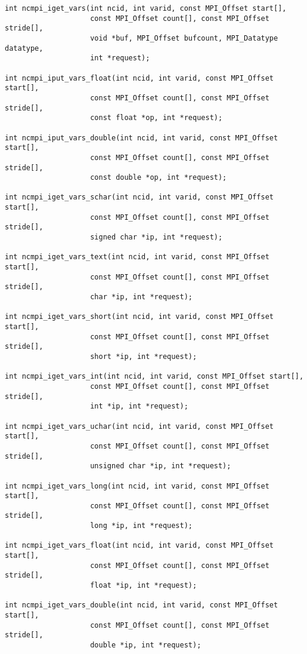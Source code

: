 \begin{verbatim}
int ncmpi_iget_vars(int ncid, int varid, const MPI_Offset start[],
                    const MPI_Offset count[], const MPI_Offset stride[],
                    void *buf, MPI_Offset bufcount, MPI_Datatype datatype,
                    int *request); 

int ncmpi_iput_vars_float(int ncid, int varid, const MPI_Offset start[],
                    const MPI_Offset count[], const MPI_Offset stride[],
                    const float *op, int *request); 

int ncmpi_iput_vars_double(int ncid, int varid, const MPI_Offset start[],
                    const MPI_Offset count[], const MPI_Offset stride[],
                    const double *op, int *request); 

int ncmpi_iget_vars_schar(int ncid, int varid, const MPI_Offset start[],
                    const MPI_Offset count[], const MPI_Offset stride[],
                    signed char *ip, int *request); 

int ncmpi_iget_vars_text(int ncid, int varid, const MPI_Offset start[],
                    const MPI_Offset count[], const MPI_Offset stride[],
                    char *ip, int *request); 

int ncmpi_iget_vars_short(int ncid, int varid, const MPI_Offset start[],
                    const MPI_Offset count[], const MPI_Offset stride[],
                    short *ip, int *request); 

int ncmpi_iget_vars_int(int ncid, int varid, const MPI_Offset start[],
                    const MPI_Offset count[], const MPI_Offset stride[],
                    int *ip, int *request); 

int ncmpi_iget_vars_uchar(int ncid, int varid, const MPI_Offset start[],
                    const MPI_Offset count[], const MPI_Offset stride[],
                    unsigned char *ip, int *request);

int ncmpi_iget_vars_long(int ncid, int varid, const MPI_Offset start[],
                    const MPI_Offset count[], const MPI_Offset stride[],
                    long *ip, int *request); 

int ncmpi_iget_vars_float(int ncid, int varid, const MPI_Offset start[],
                    const MPI_Offset count[], const MPI_Offset stride[],
                    float *ip, int *request); 

int ncmpi_iget_vars_double(int ncid, int varid, const MPI_Offset start[],
                    const MPI_Offset count[], const MPI_Offset stride[],
                    double *ip, int *request); 
\end{verbatim}


